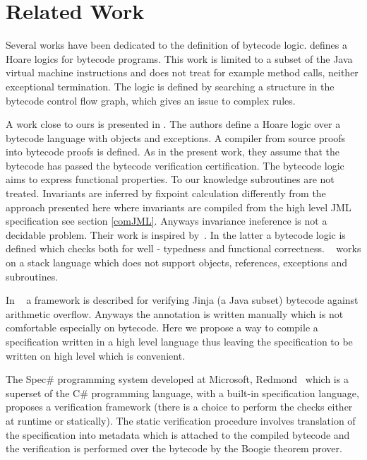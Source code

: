 \section{Related Work} \label{relWork}
    

Several works have been dedicated to the definition of bytecode logic.
 \cite{Quigley} defines a Hoare logics for bytecode programs. This work is limited to a subset of the Java virtual machine instructions and does not treat for example method calls, neither exceptional termination. The logic is defined by searching a structure in the bytecode control flow graph, which gives an issue to complex rules.

A work close to ours is presented in \cite{BM05plb}. The authors define a Hoare logic over a bytecode language with objects and  exceptions. A compiler from source proofs into bytecode proofs is defined. As in the present work, they assume that the bytecode has passed the bytecode verification certification. The bytecode logic aims to express functional properties. To our knowledge subroutines are not treated. Invariants are inferred by fixpoint calculation differently from the approach presented here where invariants are compiled from the high level JML specification see section \ref{comJML}. Anyways invariance ineference is not a decidable problem. Their work is inspired by~\cite{B04tlsj}. In the latter a bytecode logic is defined which checks both for well - typedness and functional correctness. ~\cite{B04tlsj} works on a stack language which does not support objects, references, exceptions and subroutines. 

In ~\cite{WildmoserN-ESOP05} a  framework is described for verifying Jinja (a Java subset) bytecode against arithmetic overflow. Anyways the annotation is written manually which is not comfortable especially on bytecode. Here we propose a way to compile a specification written in a high level language thus leaving the specification to be written on high level which is convenient.

The Spec\# programming system developed at Microsoft, Redmond~\cite{BLS04sp} which is a superset of the C\# programming language, with a built-in  specification language,
 proposes a verification framework (there is a choice to perform the checks either at runtime or statically). The static verification procedure  involves translation of the specification into metadata which is attached to the compiled bytecode and the verification is performed over the bytecode by the Boogie theorem prover. 
 
